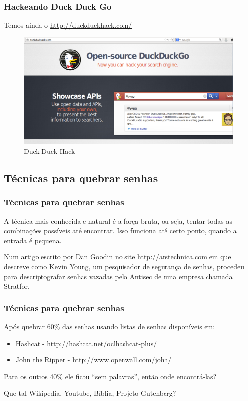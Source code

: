 \begin{frame}[fragile]\frametitle{Hackeando Duck Duck Go}

Temos ainda o \url{http://duckduckhack.com/}

\begin{figure}
    \includegraphics[scale=0.25]{img/duckduckhack.png}
    \caption{Duck Duck Hack}
\end{figure}

\end{frame}

\subsection{Técnicas para quebrar senhas}

\begin{frame}[fragile]\frametitle{Técnicas para quebrar senhas}

A técnica mais conhecida e natural é a força bruta, ou seja, tentar
todas as combinações possíveis até encontrar. Isso funciona até certo
ponto, quando a entrada é pequena.

Num artigo escrito por Dan Goodin no site \url{http://arstechnica.com}
em que descreve como Kevin Young, um pesquisador de segurança de senhas,
procedeu para descriptografar senhas vazadas pelo Antisec de uma empresa
chamada Stratfor.

\end{frame}

\begin{frame}[fragile]\frametitle{Técnicas para quebrar senhas}

Após quebrar 60\% das senhas usando listas de senhas disponíveis em:

\begin{itemize}
\item
  Hashcat - \url{http://hashcat.net/oclhashcat-plus/}
\item
  John the Ripper - \url{http://www.openwall.com/john/}
\end{itemize}
Para os outros 40\% ele ficou ``sem palavras'', então onde encontrá-las?

Que tal Wikipedia, Youtube, Bíblia, Projeto Gutenberg?

\end{frame}


